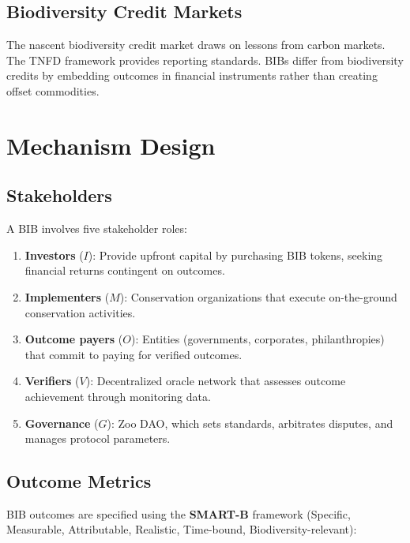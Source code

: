 \documentclass[11pt,a4paper]{article}
\begin{document}
\subsection{Biodiversity Credit Markets}

The nascent biodiversity credit market draws on lessons from carbon
markets. The TNFD framework \citep{tnfd2023framework} provides reporting
standards. BIBs differ from biodiversity credits by embedding outcomes in
financial instruments rather than creating offset commodities.


\section{Mechanism Design}
\label{sec:mechanism}

\subsection{Stakeholders}

A BIB involves five stakeholder roles:

\begin{enumerate}
  \item \textbf{Investors} ($I$): Provide upfront capital by purchasing
    BIB tokens, seeking financial returns contingent on outcomes.
  \item \textbf{Implementers} ($M$): Conservation organizations that
    execute on-the-ground conservation activities.
  \item \textbf{Outcome payers} ($O$): Entities (governments,
    corporates, philanthropies) that commit to paying for verified
    outcomes.
  \item \textbf{Verifiers} ($V$): Decentralized oracle network that
    assesses outcome achievement through monitoring data.
  \item \textbf{Governance} ($G$): Zoo DAO, which sets standards,
    arbitrates disputes, and manages protocol parameters.
\end{enumerate}

\subsection{Outcome Metrics}

BIB outcomes are specified using the \textbf{SMART-B} framework
(Specific, Measurable, Attributable, Realistic, Time-bound,
Biodiversity-relevant):
\end{document}
